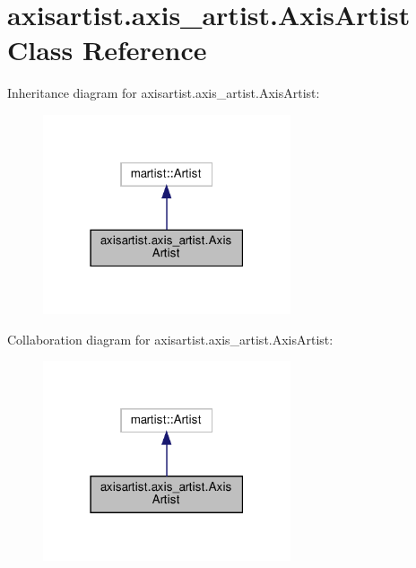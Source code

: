 \hypertarget{classaxisartist_1_1axis__artist_1_1AxisArtist}{}\section{axisartist.\+axis\+\_\+artist.\+Axis\+Artist Class Reference}
\label{classaxisartist_1_1axis__artist_1_1AxisArtist}


Inheritance diagram for axisartist.\+axis\+\_\+artist.\+Axis\+Artist\+:
\nopagebreak
\begin{figure}[H]
\begin{center}
\leavevmode
\includegraphics[width=207pt]{classaxisartist_1_1axis__artist_1_1AxisArtist__inherit__graph}
\end{center}
\end{figure}


Collaboration diagram for axisartist.\+axis\+\_\+artist.\+Axis\+Artist\+:
\nopagebreak
\begin{figure}[H]
\begin{center}
\leavevmode
\includegraphics[width=207pt]{classaxisartist_1_1axis__artist_1_1AxisArtist__coll__graph}
\end{center}
\end{figure}
